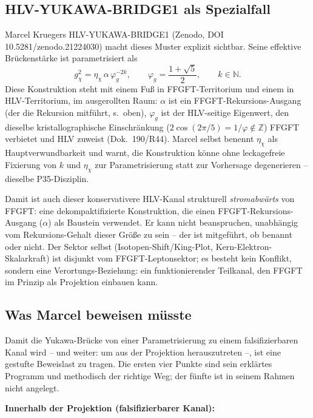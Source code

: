 \subsection*{HLV-YUKAWA-BRIDGE1 als Spezialfall}

Marcel Kruegers HLV-YUKAWA-BRIDGE1 (Zenodo, DOI 10.5281/zenodo.21224030)
macht dieses Muster explizit sichtbar. Seine effektive Brückenstärke ist
parametrisiert als
\begin{equation}
  g_\chi^2 = \eta_\chi\,\alpha\,\varphi_g^{-2k}, \qquad
  \varphi_g = \frac{1+\sqrt5}{2}, \qquad k \in \mathbb{N}.
\end{equation}
Diese Konstruktion steht mit einem Fuß in FFGFT-Territorium und einem in
HLV-Territorium, im ausgerollten Raum: $\alpha$ ist ein
FFGFT-Rekursions-Ausgang (der die Rekursion mitführt, s.\ oben), $\varphi_g$
ist der HLV-seitige Eigenwert, den dieselbe kristallographische Einschränkung
($2\cos(2\pi/5) = 1/\varphi \notin \mathbb{Z}$) FFGFT verbietet und HLV
zuweist (Dok.~190/R44). Marcel selbst benennt $\eta_\chi$ als
Hauptverwundbarkeit und warnt, die Konstruktion könne ohne
leckagefreie Fixierung von $k$ und $\eta_\chi$ zur Parametrisierung statt zur
Vorhersage degenerieren -- dieselbe P35-Disziplin.

Damit ist auch dieser konservativere HLV-Kanal strukturell \emph{stromabwärts}
von FFGFT: eine dekompaktifizierte Konstruktion, die einen
FFGFT-Rekursions-Ausgang ($\alpha$) als Baustein verwendet. Er kann nicht
beanspruchen, unabhängig vom Rekursions-Gehalt dieser Größe zu sein -- der ist
mitgeführt, ob benannt oder nicht. Der Sektor selbst
(Isotopen-Shift/King-Plot, Kern-Elektron-Skalarkraft) ist disjunkt vom
FFGFT-Leptonsektor; es besteht kein Konflikt, sondern eine
Verortungs-Beziehung: ein funktionierender Teilkanal, den FFGFT im Prinzip
als Projektion einbauen kann.

\subsection*{Was Marcel beweisen müsste}

Damit die Yukawa-Brücke von einer Parametrisierung zu einem falsifizierbaren
Kanal wird -- und weiter: um aus der Projektion herauszutreten --, ist eine
gestufte Beweislast zu tragen. Die ersten vier Punkte sind sein erklärtes
Programm und methodisch der richtige Weg; der fünfte ist in seinem Rahmen
nicht angelegt.

\textbf{Innerhalb der Projektion (falsifizierbarer Kanal):}

